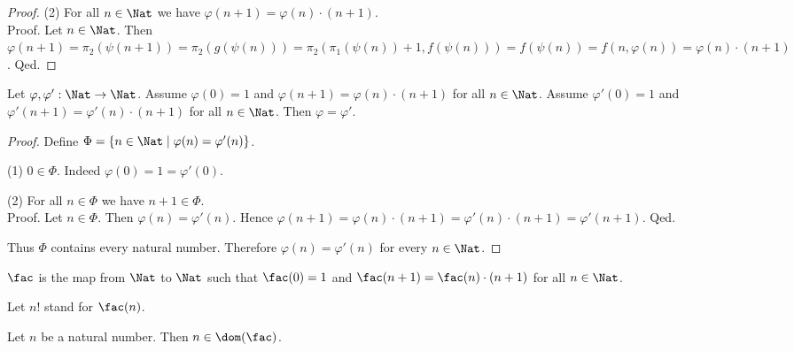 \documentclass[../arithmetic.tex]{subfiles}
\begin{document}
\begin{forthel}
\begin{proof}
      (2) For all $n \in \Nat$ we have $\varphi(n + 1) =
      \varphi(n) \cdot (n + 1)$. \\
      Proof.
        Let $n \in \Nat$.
        Then $\varphi(n + 1)
          = \pi_{2}(\psi(n + 1))
          = \pi_{2}(g(\psi(n)))
          = \pi_{2}(\pi_{1}(\psi(n)) + 1, f(\psi(n)))
          = f(\psi(n))
          = f(n, \varphi(n))
          = \varphi(n) \cdot (n + 1)$.
      Qed.
    \end{proof}
  \end{forthel}

  \begin{forthel}
    \begin{lemma}
      Let $\varphi, \varphi' : \Nat \to \Nat$.
      Assume $\varphi(0) = 1$ and $\varphi(n + 1) = \varphi(n) \cdot (n + 1)$
      for all $n \in \Nat$.
      Assume $\varphi'(0) = 1$ and $\varphi'(n + 1) = \varphi'(n) \cdot (n + 1)$
      for all $n \in \Nat$.
      Then $\varphi = \varphi'$.
    \end{lemma}
    \begin{proof}
      Define $\Phi = \{ n \in \Nat \mid \varphi(n) = \varphi'(n) \}$.

      (1) $0 \in \Phi$.
      Indeed $\varphi(0) = 1 = \varphi'(0)$.

      (2) For all $n \in \Phi$ we have $n + 1 \in \Phi$. \\
      Proof.
        Let $n \in \Phi$.
        Then $\varphi(n) = \varphi'(n)$.
        Hence $\varphi(n + 1)
          = \varphi(n) \cdot (n + 1)
          = \varphi'(n) \cdot (n + 1)
          = \varphi'(n + 1)$.
      Qed.

      Thus $\Phi$ contains every natural number.
      Therefore $\varphi(n) = \varphi'(n)$ for every $n \in \Nat$.
    \end{proof}
  \end{forthel}

  \begin{forthel}
    \begin{definition}
      $\fac$ is the map from $\Nat$ to $\Nat$ such that $\fac(0) = 1$ and
      $\fac(n + 1) = \fac(n) \cdot (n + 1)$ for all $n \in \Nat$.
    \end{definition}

    Let $n!$ stand for $\fac(n)$.
  \end{forthel}

  \begin{forthel}
    \begin{lemma}
      Let $n$ be a natural number.
      Then $n \in \dom(\fac)$.
    \end{lemma}
  \end{forthel}
\end{document}
